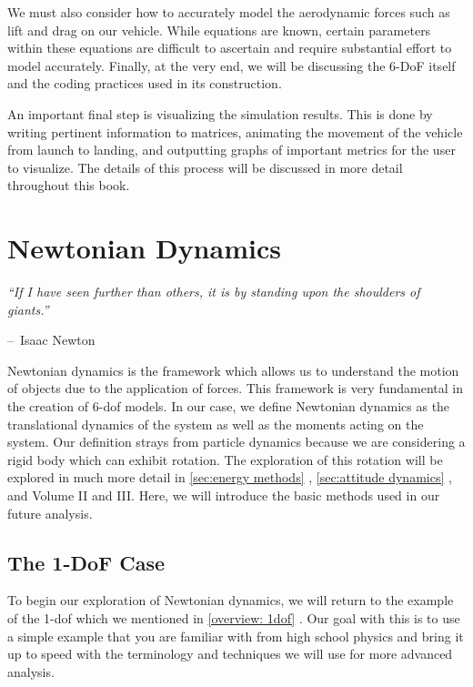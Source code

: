 \documentclass[10pt, openany, titlepage]{book}
\makeatletter
\theoremstyle{definition}
\newcounter{example}[chapter]
\let\oldautoref\autoref
\renewcommand{\autoref}[1]{%
  \begingroup
  \hypersetup{linkcolor=black}%
  \oldautoref{#1}%
  \endgroup
}
\newenvironment{chapquote}[2][2em]
  {\setlength{\@tempdima}{#1}%
   \def\chapquote@author{#2}%
   \parshape 1 \@tempdima \dimexpr\textwidth-2\@tempdima\relax%
   \itshape}
  {\par\normalfont\hfill--\ \chapquote@author\hspace*{\@tempdima}\par\bigskip}
\makeatother
\begin{document}
We must also consider how to accurately model the aerodynamic forces such as lift and drag on our vehicle. While equations are known, certain parameters within these equations are difficult to ascertain and require substantial effort to model accurately. Finally, at the very end, we will be discussing the 6-DoF itself and the coding practices used in its construction. 

An important final step is visualizing the simulation results. This is done by writing pertinent information to matrices, animating the movement of the vehicle from launch to landing, and outputting graphs of important metrics for the user to visualize. The details of this process will be discussed in more detail throughout this book.


\chapter{Newtonian Dynamics}\label{sec: Newtonian Dynamics}
\begin{chapquote}{Isaac Newton}
``If I have seen further than others, it is by standing upon the shoulders of giants.''
\end{chapquote}

Newtonian dynamics is the framework which allows us to understand the motion of objects due to the application of forces. This framework is very fundamental in the creation of 6-\gls{dof} models. In our case, we define Newtonian dynamics as the translational dynamics of the system as well as the moments acting on the system. Our definition strays from particle dynamics because we are considering a rigid body which can exhibit rotation. The exploration of this rotation will be explored in much more detail in \autoref{sec:energy methods}, \autoref{sec:attitude dynamics}, and Volume II and III. Here, we will introduce the basic methods used in our future analysis.
\section{The 1-DoF Case}\label{sec: The 1DoF Case}
To begin our exploration of Newtonian dynamics, we will return to the example of the 1-\gls{dof} which we mentioned in \autoref{overview: 1dof}. Our goal with this is to use a simple example that you are familiar with from high school physics and bring it up to speed with the terminology and techniques we will use for more advanced analysis.
\end{document}
